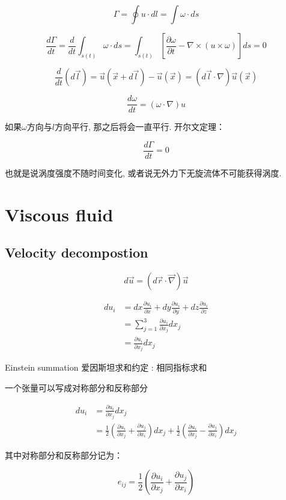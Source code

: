 \documentclass[fontset=windows]{report}
\begin{document}
\[\Gamma=\oint u\cdot dl=\int\omega\cdot ds\]

\[\frac{d\Gamma}{dt}=\frac{d}{dt}\int_{s(t)}\omega\cdot ds=\int_{s(t)} \left[\frac{\partial \omega}{\partial t}-\nabla\times(u\times\omega)\right]ds=0\]

\[\frac{d}{dt}(d\vec l)=\vec u(\vec x+d\vec l)-\vec u(\vec x)=(d\vec l\cdot \nabla)\vec u(\vec x)\]

\[\frac{d\omega}{dt}=(\omega\cdot\nabla)u\]

如果\(\omega\)方向与\(l\)方向平行, 那之后将会一直平行. 开尔文定理：

\[\frac{d\Gamma}{dt}=0 \label{kel}\]

也就是说涡度强度不随时间变化, 或者说无外力下无旋流体不可能获得涡度.



\chapter{Viscous fluid}

\section{Velocity decompostion}

\[d\vec u = (d\vec r\cdot\vec \nabla)\vec u\]

\begin{align}
du_i &= dx\frac{\partial u_i}{\partial x}+dy\frac{\partial u_i}{\partial y}+dz\frac{\partial u_i}{\partial z}\\
&=\sum_{j=1}^{3}\frac{\partial u_i}{\partial x_j}dx_j\\
&=\frac{\partial u_i}{\partial x_j}dx_j
\end{align}

Einstein summation 爱因斯坦求和约定 : 相同指标求和

一个张量可以写成对称部分和反称部分

\begin{align}
du_i &=\frac{\partial u_i}{\partial x_j}dx_j\\
&=\frac{1}{2}
\left(\frac{\partial u_i}{\partial x_j}
+\frac{\partial u_j}{\partial x_i}\right)dx_j+
\frac{1}{2}
\left(\frac{\partial u_i}{\partial x_j}
-\frac{\partial u_j}{\partial x_i}\right)dx_j
\end{align}

其中对称部分和反称部分记为：

\[e_{ij}=\frac{1}{2}\left(\frac{\partial u_i}{\partial x_j}+\frac{\partial u_j}{\partial x_i}\right)
\label{jqxb}\]
\end{document}
